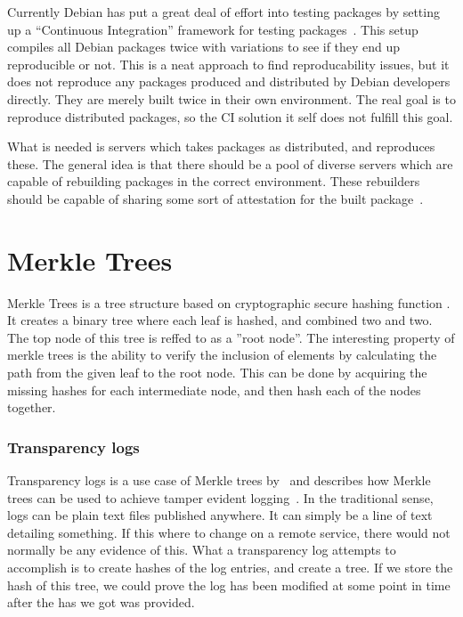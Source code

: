 \documentclass[../Main/thesis.tex]{subfiles}
\begin{document}
Currently Debian has put a great deal of effort into testing packages by setting
up a ``Continuous Integration'' framework for testing packages~\cite{debian-ci}.
This setup compiles all Debian packages twice with variations to see if they end
up reproducible or not. This is a neat approach to find reproducability issues,
but it does not reproduce any packages produced and distributed by Debian
developers directly. They are merely built twice in their own environment. The
real goal is to reproduce distributed packages, so the CI solution it self does
not fulfill this goal.

What is needed is servers which takes packages as distributed, and reproduces
these. The general idea is that there should be a pool of diverse servers which
are capable of rebuilding packages in the correct environment. These rebuilders
should be capable of sharing some sort of attestation for the built
package~\cite{reproducible-builds-sharing}.

\section{Merkle Trees}%
\label{sec:merkle_trees}

Merkle Trees is a tree structure based on cryptographic secure hashing function
\cite{ralph-c.-merkle-1998}. It creates a binary tree where each leaf is hashed,
and combined two and two. The top node of this tree is reffed to as a ''root
node''. The interesting property of merkle trees is the ability to verify the
inclusion of elements by calculating the path from the given leaf to the root
node. This can be done by acquiring the missing hashes for each intermediate
node, and then hash each of the nodes together.

\subsubsection*{Transparency logs}%
\label{sub:certificate_transparency_log}
Transparency logs is a use case of Merkle trees by~\citeauthor{182788} and
describes how Merkle trees can be used to achieve tamper evident
logging~\cite{182788}. In the traditional sense, logs can be plain text files
published anywhere. It can simply be a line of text detailing something. If this
where to change on a remote service, there would not normally be any evidence of
this. What a transparency log attempts to accomplish is to create hashes of the
log entries, and create a tree. If we store the hash of this tree, we could
prove the log has been modified at some point in time after the has we got was
provided. 
\end{document}
